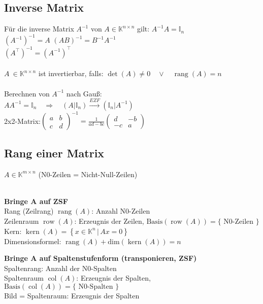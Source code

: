 \documentclass[german, 6pt]{latex4ei/latex4ei_sheet}
\newcommand{\dme}[2]{\ensuremath{\left\{#1\,\vert\,#2 \right\}}}
\newcommand{\enbrace}[1]{\ensuremath{\left(#1\right)}}
\DeclareMathOperator{\rang}{rang}
\DeclareMathOperator{\col}{col}
\DeclareMathOperator{\row}{row}
\DeclareMathOperator{\Kern}{kern}
\begin{document}
\subsection{Inverse Matrix}
Für die inverse Matrix $A^{-1}$ von $A\in \mathbb K^{n\times n}$ gilt: $A^{-1}A=\mathbb{I}_n$\\
$(A^{-1})^{-1}=A$ \qquad $(AB)^{-1}=B^{-1}A^{-1}$ \\
$(A^\top)^{-1}=(A^{-1})^\top$\\
\\
$A\ \in \mathbb K^{n\times n}$ ist invertierbar, falls: $\det (A) \ne 0 \quad \lor \quad \rang(A)=n$\\
\\
Berechnen von $A^{-1}$ nach Gauß:\\
$AA^{-1}=\mathbb{I}_n\quad\Rightarrow\quad (A|\mathbb{I}_n)\overset{EZF}{\longrightarrow}(\mathbb{I}_n|A^{-1})$\\
2x2-Matrix:$\enbrace{\begin{matrix}
a & b \\
c & d
\end{matrix}}^{-1} = \frac{1}{ad-bc}\begin{pmatrix}
d & -b \\
-c & a
\end{pmatrix}$

\subsection{Rang einer Matrix}
$A\in \mathbb K^{m\times n}$ 
{(N0-Zeilen = Nicht-Null-Zeilen)}\\ \\
\begin{minipage}{\columnwidth}
\textbf{Bringe A auf ZSF} \\
Rang (Zeilrang) $\rang(A)$: Anzahl N0-Zeilen \\     
Zeilenraum $\row(A)$: Erzeugnis der Zeilen, $\text{Basis}(\row(A)) = \{\text{ N0-Zeilen }\}$ \\
Kern: $\Kern(A) = \dme{x \in \mathbb K^n}{Ax= 0}$ \\
Dimensionsformel: $\rang(A) + \mathrm{dim}(\Kern(A)) = n$ \\
\end{minipage}
\begin{minipage}{\columnwidth}
\textbf{Bringe A auf Spaltenstufenform (transponieren, ZSF)} \\
Spaltenrang: Anzahl der N0-Spalten\\
Spaltenraum $\col(A)$: Erzeugnis der Spalten, $\text{Basis}(\col(A)) = \{\text{ N0-Spalten }\}$ \\
Bild = Spaltenraum: Erzeugnis der Spalten 
\end{minipage}
\end{document}
